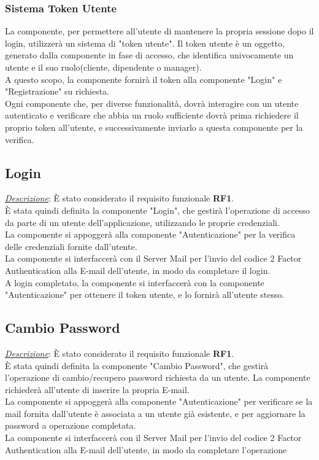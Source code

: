 \documentclass{report}
\begin{document}
\subsubsection*{Sistema Token Utente}
La componente, per permettere all'utente di mantenere la propria sessione dopo il login, utilizzerà un sistema di "token utente".
Il token utente è un oggetto, generato dalla componente in fase di accesso, che identifica univocamente un utente e il suo ruolo(cliente, dipendente o manager).\\
A questo scopo, la componente fornirà il token alla componente "Login" e "Registrazione" su richiesta.\\
Ogni componente che, per diverse funzionalità, dovrà interagire con un utente autenticato  e verificare che abbia un ruolo sufficiente dovrà prima richiedere il proprio token all'utente, 
e successivamente inviarlo a questa componente per la verifica.

\subsection*{Login}
\uline{\textit{Descrizione}}:
È stato considerato il requisito funzionale \textbf{RF1}.\\
È stata quindi definita la componente "Login", che gestirà l'operazione di accesso da parte di un utente dell'applicazione, utilizzando le proprie credenziali.\\
La componente si appoggerà alla componente "Autenticazione" per la verifica delle credenziali fornite dall'utente.\\ 
La componente si interfaccerà con il Server Mail per l'invio del codice 2 Factor Authentication alla E-mail dell'utente, in modo da completare il login.\\
A login completato, la componente si interfaccerà con la componente "Autenticazione" per ottenere il token utente, e lo fornirà all'utente stesso.

\subsection*{Cambio Password}
\uline{\textit{Descrizione}}:
È stato considerato il requisito funzionale \textbf{RF1}.\\
È stata quindi definita la componente "Cambio Password", che gestirà l'operazione di cambio/recupero password richiesta da un utente.
La componente richiederà all'utente di inserire la propria E-mail.\\
La componente si appoggerà alla componente "Autenticazione" per verificare se la mail fornita dall'utente è associata a un utente già esistente, e per aggiornare la password a operazione completata.\\
La componente si interfaccerà con il Server Mail per l'invio del codice 2 Factor Authentication alla E-mail dell'utente, in modo da completare l'operazione
\end{document}
